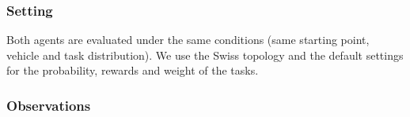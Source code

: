 \documentclass[11pt]{article}
\begin{document}
\subsubsection{Setting}
Both agents are evaluated under the same conditions (same starting point, vehicle and task distribution). We use the Swiss topology and the default settings for the probability, rewards and weight of the tasks.

\subsubsection{Observations}
\end{document}

